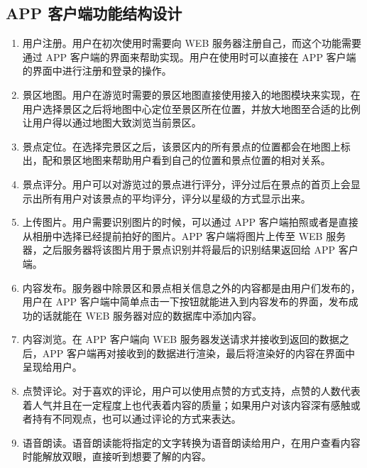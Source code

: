         \subsection{APP 客户端功能结构设计}

        \begin{enumerate}
            
            \item 用户注册。用户在初次使用时需要向 WEB 服务器注册自己，而这个功能需要通过 APP 客户端的界面来帮助实现。用户在使用时可以直接在 APP 客户端的界面中进行注册和登录的操作。
            
            \item 景区地图。用户在游览时需要的景区地图直接使用接入的地图模块来实现，在用户选择景区之后将地图中心定位至景区所在位置，并放大地图至合适的比例让用户得以通过地图大致浏览当前景区。
            
            \item 景点定位。在选择完景区之后，该景区内的所有景点的位置都会在地图上标出，配和景区地图来帮助用户看到自己的位置和景点位置的相对关系。
            
            \item 景点评分。用户可以对游览过的景点进行评分，评分过后在景点的首页上会显示出所有用户对该景点的平均评分，评分以星级的方式显示出来。
            
            \item 上传图片。用户需要识别图片的时候，可以通过 APP 客户端拍照或者是直接从相册中选择已经提前拍好的图片。APP 客户端将图片上传至 WEB 服务器，之后服务器将该图片用于景点识别并将最后的识别结果返回给 APP 客户端。
            
            \item 内容发布。服务器中除景区和景点相关信息之外的内容都是由用户们发布的，用户在 APP 客户端中简单点击一下按钮就能进入到内容发布的界面，发布成功的话就能在 WEB 服务器对应的数据库中添加内容。
            
            \item 内容浏览。在 APP 客户端向 WEB 服务器发送请求并接收到返回的数据之后，APP 客户端再对接收到的数据进行渲染，最后将渲染好的内容在界面中呈现给用户。
            
            \item 点赞评论。对于喜欢的评论，用户可以使用点赞的方式支持，点赞的人数代表着人气并且在一定程度上也代表着内容的质量；如果用户对该内容深有感触或者持有不同观点，也可以通过评论的方式来表达。
            
            \item 语音朗读。语音朗读能将指定的文字转换为语音朗读给用户，在用户查看内容时能解放双眼，直接听到想要了解的内容。

        \end{enumerate}

